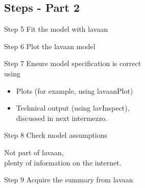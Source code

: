 \documentclass[10pt]{beamer}\usepackage[]{graphicx}\usepackage[]{xcolor}
\begin{document}
\subsection*{Steps - Part 2}
%
\begin{frame}{Step 5}
\Large Fit the model with lavaan
\end{frame}
\begin{frame}{Step 6}
\Large Plot the lavaan model
\end{frame}
\begin{frame}{Step 7}
\Large Ensure model specification is correct\\
using
\begin{itemize}
\item{Plots (for example, using lavaanPlot)}
\item{Technical output (using lavInspect), \\ discussed in next intermezzo.}
\end{itemize}
\end{frame}
\begin{frame}{Step 8}
\Large Check model assumptions

\vspace{5mm}

Not part of lavaan,\\
plenty of information on the internet.
\end{frame}
\begin{frame}{Step 9}
\Large Acquire the summary from lavaan
\end{frame}
%
\end{document}
